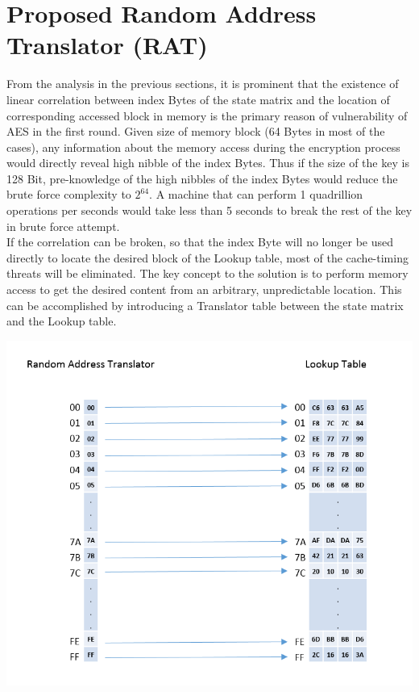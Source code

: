 \section{Proposed Random Address Translator (RAT)}

From the analysis in the previous sections, it is prominent that the existence of linear correlation between index Bytes of the state matrix and the location of corresponding accessed block in memory is the primary reason of vulnerability of AES in the first round. Given size of memory block (64 Bytes in most of the cases), any information about the memory access during the encryption process would directly reveal high nibble of the index Bytes. Thus if the size of the key is 128 Bit, pre-knowledge of the high nibbles of the index Bytes would reduce the brute force complexity to $2^{64}$. A machine that can perform 1 quadrillion operations per seconds would take less than 5 seconds to break the rest of the key in brute force attempt.\\

If the correlation can be broken, so that the index Byte will no longer be used directly to locate the desired block of the Lookup table, most of the cache-timing threats will be eliminated. The key concept to the solution is to perform memory access to get the desired content from an arbitrary, unpredictable location. This can be accomplished by introducing a Translator table between the state matrix and the Lookup table.

\begin{center}
\includegraphics[scale=0.4,natwidth=785,natheight=666]{Figures/rat-init(new).png}
\label{fig: Random Address Translator Initialization.}
\end{center}

